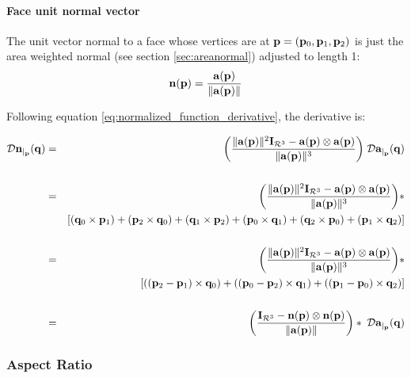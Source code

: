 
\paragraph{Face unit normal vector}
\label{sec:facenormal}

The unit vector normal to a face whose vertices are at
${\mathbf p} = ({\mathbf p}_0,{\mathbf p}_1,{\mathbf p}_2)$ is just the area weighted normal (see section \ref{sec:areanormal})
adjusted to length 1:
\begin{equation}
{\mathbf n}({\mathbf p})  =  {{{\mathbf a}({\mathbf p})} \over {\| {\mathbf a}({\mathbf p}) \|}}
\end{equation}

Following equation \ref{eq:normalized_function_derivative}, the derivative is:

\begin{eqnarray}
\label{eq:unit_normal_derivative}
\Dc{\n}{\p}{\q}
&  =
& { \left( {\| \a(\p) \|^2 \I_{\Re^3}  -  \a(\p) \otimes \a(\p) } \over {\| \a(\p) \|^3} \right) }
\; \Dc{\a}{\p}{\q}
 \\
& & \nonumber\\
&  =
& { \left( {\| \a(\p) \|^2 \I_{\Re^3}  -  \a(\p) \otimes \a(\p) } \over {\| \a(\p) \|^3} \right)} \ast
\nonumber \\
&    &
\left[ \left( \q_0 \times \p_1 \right) + \left( \p_2 \times \q_0 \right)
+
\left( \q_1 \times \p_2 \right) + \left( \p_0 \times \q_1 \right)
+
\left( \q_2 \times \p_0 \right) + \left( \p_1 \times \q_2 \right) \right]
\nonumber \\
& & \nonumber\\
&  =
& { \left( {\| \a(\p) \|^2 \I_{\Re^3}  -  \a(\p) \otimes \a(\p) } \over {\| \a(\p) \|^3} \right)} \ast
\nonumber \\
&    &
\left[ \left( (\p_2 - \p_1) \times \q_0 \right)
+
\left( (\p_0 - \p_2) \times \q_1 \right)
+
\left( (\p_1 - \p_0) \times \q_2 \right) \right]
\nonumber \\
& & \nonumber\\
&  =
& { \left( {\I_{\Re^3}  -  \n(\p) \otimes \n(\p) } \over {\| \a(\p) \|} \right)} \ast \; \Dc{\a}{\p}{\q}
\nonumber
\end{eqnarray}


\subsubsection{Aspect Ratio}
\label{sec:aspect_ratio}

